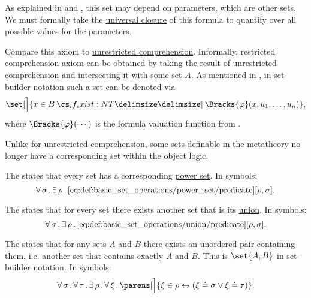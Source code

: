 \begin{definition}
\begin{thmenum}
    As explained in  and , this set may depend on parameters, which are other sets. We must formally take the \hyperref[def:universal_closure]{universal closure} of this formula to quantify over all possible values for the parameters.

    Compare this axiom to \hyperref[def:naive_set_theory/unrestricted_comprehension]{unrestricted comprehension}. Informally, restricted comprehension axiom can be obtained by taking the result of unrestricted comprehension and intersecting it with some set \( A \). As mentioned in , in set-builder notation such a set can be denoted via
    \begin{equation*}
      \set[\Big]{ x \in B \given* \Bracks{\varphi}(x, u_1, \ldots, u_n) },
    \end{equation*}
    where \( \Bracks{\varphi}(\cdots) \) is the formula valuation function from .

    Unlike for unrestricted comprehension, some sets definable in the metatheory no longer have a corresponding set within the object logic.

     The  states that every set has a corresponding \hyperref[def:basic_set_operations/power_set]{power set}. In symbols:
    \begin{equation}\label{eq:def:zfc/power_set}
      \forall \thinspace \sigma \thinspace . \thinspace \exists \thinspace \rho \thinspace . \thinspace \ref{eq:def:basic_set_operations/power_set/predicate}[\rho, \sigma].
    \end{equation}

     The  states that for every set there exists another set that is its \hyperref[def:basic_set_operations/union]{union}. In symbols:
    \begin{equation}\label{eq:def:zfc/union}
      \forall \thinspace \sigma \thinspace . \thinspace \exists \thinspace \rho \thinspace . \thinspace \ref{eq:def:basic_set_operations/union/predicate}[\rho, \sigma].
    \end{equation}

     The  states that for any sets \( A \) and \( B \) there exists an unordered pair containing them, i.e. another set that contains exactly \( A \) and \( B \). This is \( \set{ A, B } \) in set-builder notation. In symbols:
    \begin{equation}\label{eq:def:zfc/pairing}
      \qforall \sigma \qforall \tau \qexists \rho \qforall \xi \parens[\Big]{ \xi \in \rho \leftrightarrow ( \xi \doteq \sigma \vee \xi \doteq \tau) }.
    \end{equation}


\end{thmenum}
\end{definition}
